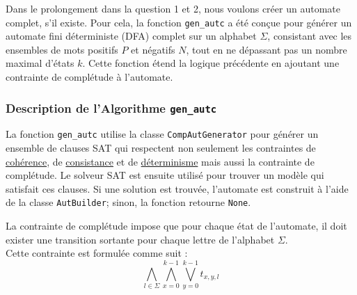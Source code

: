 
Dans le prolongement dans la question 1 et 2, nous voulons créer un automate complet, s'il existe. Pour cela, la fonction \texttt{gen\_autc} a été conçue pour générer un automate fini déterministe (DFA) complet sur un alphabet \( \Sigma \), consistant avec les ensembles de mots positifs \( P \) et négatifs \( N \), tout en ne dépassant pas un nombre maximal d'états \( k \). Cette fonction étend la logique précédente en ajoutant une contrainte de complétude à l'automate.

\subsubsection*{Description de l'Algorithme \texttt{gen\_autc}}

La fonction \texttt{gen\_autc} utilise la classe \texttt{CompAutGenerator} pour générer un ensemble de clauses SAT qui respectent non seulement les contraintes de \hyperref[cohérence]{cohérence}, de \hyperref[consistance]{consistance} et de \hyperref[determinisme]{déterminisme} mais aussi la contrainte de complétude. Le solveur SAT est ensuite utilisé pour trouver un modèle qui satisfait ces clauses. Si une solution est trouvée, l'automate est construit à l'aide de la classe \texttt{AutBuilder}; sinon, la fonction retourne \texttt{None}.

\vspace{0.5cm}

{}
\begin{tcolorbox}[defaultstyle,title= Contrainte de Complétude]
La contrainte de complétude impose que pour chaque état de l'automate, il doit exister une transition sortante pour chaque lettre de l'alphabet \( \Sigma \).\\

Cette contrainte est formulée comme suit :
\[\bigwedge\limits_{l \in \Sigma} \bigwedge\limits_{x=0}^{k-1} \bigvee\limits_{y=0}^{k-1} t_{x,y,l}\]
\end{tcolorbox}